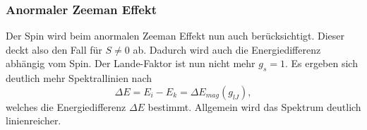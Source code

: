\newpage \subsubsection{Anormaler Zeeman Effekt}
Der Spin wird beim anormalen Zeeman Effekt nun auch berücksichtigt. Dieser deckt also den Fall für $S\neq 0$ ab. Dadurch wird auch die Energiedifferenz abhängig vom Spin. Der Lande-Faktor ist nun nicht mehr $g_s=1$. Es ergeben sich deutlich mehr Spektrallinien nach 
\begin{equation}
    \Delta E=E_i-E_k=\Delta E_{mag}(g_{lJ}),
\end{equation}
 welches die Energiedifferenz $\Delta E$ bestimmt. Allgemein wird das Spektrum deutlich linienreicher.
